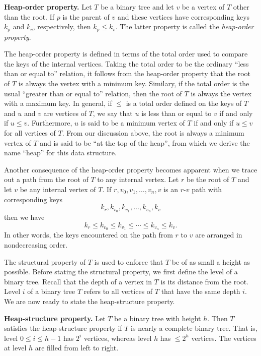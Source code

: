 \begin{definition}
\textbf{Heap-order property.}
Let $T$ be a binary tree and let $v$ be a vertex of $T$ other than the
root. If $p$ is the parent of $v$ and these vertices have corresponding
keys $k_p$ and $k_v$, respectively, then $k_p \leq k_v$. The latter
property is called the \emph{heap-order property}.
\end{definition}

The heap-order property is defined in terms
of the total order used to compare the keys of the internal
vertices. Taking the total order to be the ordinary
``less than or equal to'' relation, it follows from the heap-order
property that the root of $T$ is always the vertex with a minimum
key. Similary, if the total order is the usual
``greater than or equal to'' relation, then the root of $T$ is always
the vertex with a maximum key. In general, if $\leq$ is a total order
defined on the keys of $T$ and $u$ and $v$ are vertices of $T$, we say
that $u$ is less than or equal to $v$ if and only if $u \leq v$.
Furthermore, $u$ is said to be a minimum vertex of $T$ if and only if
$u \leq v$ for all vertices of $T$. From our discussion above, the
root is always a minimum vertex of $T$ and is said to be ``at the top
of the heap'', from which we derive the name ``heap'' for this data
structure.

Another consequence of the heap-order
property becomes apparent when we trace out a path from the root of
$T$ to any internal vertex. Let $r$ be the root of $T$ and let $v$ be
any internal vertex of $T$. If $r, v_0, v_1, \dots, v_n, v$ is an
$r$-$v$ path with corresponding keys
\[
k_r, k_{v_0}, k_{v_1}, \dots, k_{v_n}, k_v
\]
then we have
\[
k_r \leq k_{v_0} \leq k_{v_1} \leq \cdots \leq k_{v_n} \leq k_v.
\]
In other words, the keys encountered on the path from $r$ to $v$ are
arranged in nondecreasing order.

The structural property of $T$ is used to enforce that $T$ be of as
small a height as possible. Before stating the structural property, we
first define the level of a binary
tree. Recall that the depth of a vertex in $T$ is its distance from
the root. Level $i$ of a binary tree $T$
refers to all vertices of $T$ that have the same depth $i$. We are now
ready to state the heap-structure property.

\begin{definition}
\textbf{Heap-structure property.}
Let $T$ be a binary tree with height $h$. Then $T$ satisfies the
heap-structure property if $T$ is nearly a
complete binary tree. That is, level
$0 \leq i \leq h - 1$ has $2^i$ vertices, whereas level $h$ has
$\leq 2^h$ vertices. The vertices at level $h$ are filled from left to
right.
\end{definition}

